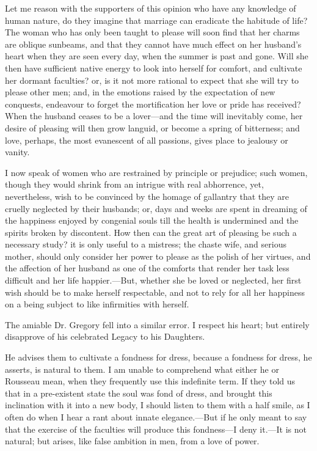 Let me reason with the supporters of this opinion who have any
knowledge of human nature, do they imagine that marriage can eradicate
the habitude of life? The woman who has only been taught to please
will soon find that her charms are oblique sunbeams, and that they
cannot have much effect on her husband's heart when they are seen
every day, when the summer is past and gone. Will she then have
sufficient native energy to look into herself for comfort, and
cultivate  her dormant faculties? or, is it not more rational
to expect that she will try to please other men; and, in the emotions
raised by the expectation of new conquests, endeavour to forget the
mortification her love or pride has received? When the husband ceases
to be a lover---and the time will inevitably come, her desire of
pleasing will then grow languid, or become a spring of bitterness; and
love, perhaps, the most evanescent of all passions, gives place to
jealousy or vanity.


I now speak of women who are restrained by principle or prejudice;
such women, though they would shrink from an intrigue with real
abhorrence, yet, nevertheless, wish to be convinced by the homage of
gallantry that they are cruelly neglected by their husbands; or, days
and weeks are spent in dreaming of the happiness enjoyed by congenial
souls till the health is undermined and the spirits broken by
discontent. How then can the great art of pleasing be such a necessary
study? it is only useful to a mistress; the chaste wife, and serious
mother, should only consider her power to please as the polish of her
virtues, and the affection of her husband as one of the comforts that
render her task less difficult and  her life happier.---But,
whether she be loved or neglected, her first wish should be to make
herself respectable, and not to rely for all her happiness on a being
subject to like infirmities with herself.

The amiable Dr. Gregory fell into a similar error. I respect his
heart; but entirely disapprove of his celebrated Legacy to his
Daughters.

He advises them to cultivate a fondness for dress, because a fondness
for dress, he asserts, is natural to them. I am unable to comprehend
what either he or Rousseau mean, when they frequently use this
indefinite term. If they told us that in a pre-existent state the
soul was fond of dress, and brought this inclination with it into a
new body, I should listen to them with a half smile, as I often do
when I hear a rant about innate elegance.---But if he only meant to
say that the exercise of the faculties will produce this fondness---I
deny it.---It is not natural; but arises, like false ambition in men,
from a love of power.

